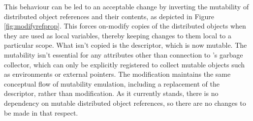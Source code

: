 \documentclass[10pt, a4paper]{article}
\begin{document}
This behaviour can be led to an acceptable change by inverting the mutability of distributed object references and their contents, as depicted in Figure \ref{fig:modifyrefprop}.
This forces on-modify copies of the distributed objects when they are used as local variables, thereby keeping changes to them local to a particular scope.
What isn't copied is the descriptor, which is now mutable.
The mutability isn't essential for any attributes other than connection to \R{}'s garbage collector, which can only be explicitly registered to collect mutable objects such as environments or external pointers.
The modification maintains the same conceptual flow of mutability emulation, including a replacement of the descriptor, rather than modification.
As it currently stands, there is no \lsr{} dependency on mutable distributed object references, so there are no changes to be made in that respect.

\end{document}
